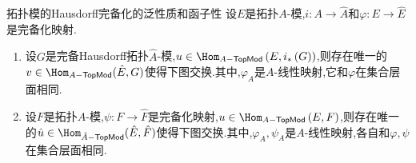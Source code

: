 \begin{proposition}{拓扑模的Hausdorff完备化的泛性质和函子性}{}
	设$E$是拓扑$A$-模,$i:A\to\hat{A}$和$\varphi:E\to\hat{E}$是完备化映射.
	\begin{enumerate}
		\item 设$G$是完备Hausdorff拓扑$\hat{A}$-模,$u\in\Hom_{A-\mathsf{TopMod}}\left(E,i_{\ast}\left(G\right)\right)$,则存在唯一的$v\in\Hom_{A-\mathsf{TopMod}}(\hat{E},G)$使得下图交换.其中,$\varphi_{A}$是$A$-线性映射,它和$\varphi$在集合层面相同.
		\begin{center}
		\end{center}
		\item 设$F$是拓扑$A$-模,$\psi:F\to\hat{F}$是完备化映射,$u\in\Hom_{A-\mathsf{TopMod}}\left(E,F\right)$,则存在唯一的$\hat{u}\in\Hom_{\hat{A}-\mathsf{TopMod}}(\hat{E},\hat{F})$使得下图交换.其中,$\varphi_{A},\psi_{A}$是$A$-线性映射,各自和$\varphi,\psi$在集合层面相同.
		\begin{center}
		\end{center}
	\end{enumerate}
\end{proposition}